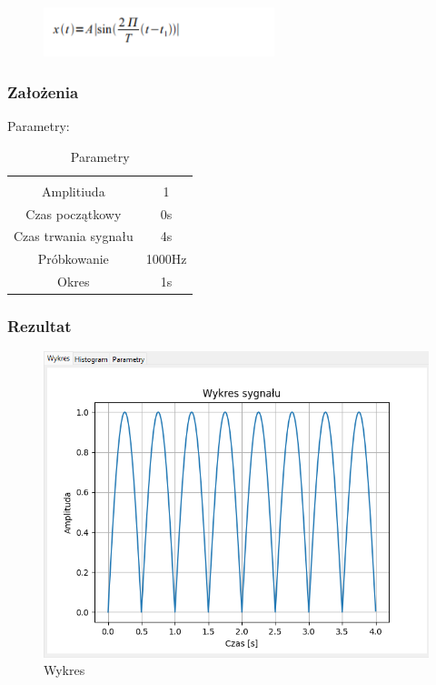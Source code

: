 \documentclass{article}
\begin{document}
\begin{figure}[!htbp]
    \centering
    \includegraphics[width=0.6\textwidth]{img/sinusdwu.png}
\end{figure}
\subsubsection{Założenia}
\noindent
Parametry:
\begin{table}[h!]
    \centering
    \vspace{0.2cm}
    \begin{tabular}{|c|c|}
        \hline\hline\\[-0.4cm]
        Amplitiuda & 1  \\
        \hline
        Czas początkowy & 0s  \\
        \hline
        Czas trwania sygnału & 4s  \\
        \hline
        Próbkowanie & 1000Hz \\
        \hline
        Okres & 1s\\
        \hline
    \end{tabular}
    \caption{Parametry}
    \label{sinusdwupolowkowy}
\end{table}
\subsubsection{Rezultat}
\begin{figure}[h!]
    \centering
    \includegraphics[width=\textwidth]{img/sinus-dwu/wykres.png}
    \caption{Wykres}
\end{figure}
\end{document}
